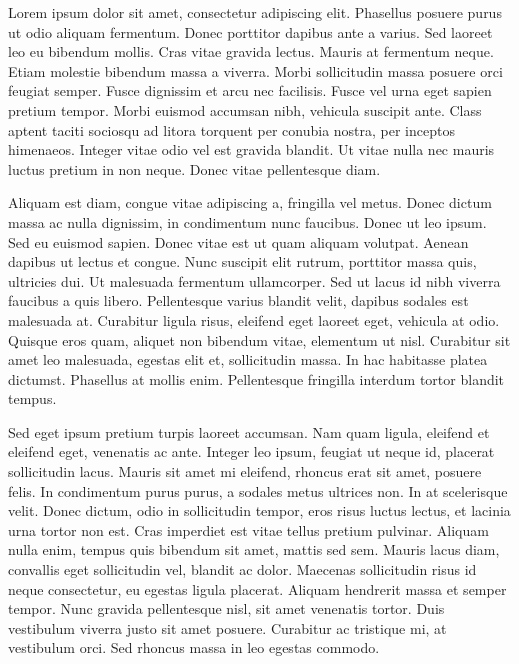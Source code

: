 

Lorem ipsum dolor sit amet, consectetur adipiscing elit. Phasellus posuere purus ut odio aliquam fermentum. Donec porttitor dapibus ante a varius. Sed laoreet leo eu bibendum mollis. Cras vitae gravida lectus. Mauris at fermentum neque. Etiam molestie bibendum massa a viverra. Morbi sollicitudin massa posuere orci feugiat semper. Fusce dignissim et arcu nec facilisis. Fusce vel urna eget sapien pretium tempor. Morbi euismod accumsan nibh, vehicula suscipit ante. Class aptent taciti sociosqu ad litora torquent per conubia nostra, per inceptos himenaeos. Integer vitae odio vel est gravida blandit. Ut vitae nulla nec mauris luctus pretium in non neque. Donec vitae pellentesque diam.

Aliquam est diam, congue vitae adipiscing a, fringilla vel metus. Donec dictum massa ac nulla dignissim, in condimentum nunc faucibus. Donec ut leo ipsum. Sed eu euismod sapien. Donec vitae est ut quam aliquam volutpat. Aenean dapibus ut lectus et congue. Nunc suscipit elit rutrum, porttitor massa quis, ultricies dui. Ut malesuada fermentum ullamcorper. Sed ut lacus id nibh viverra faucibus a quis libero. Pellentesque varius blandit velit, dapibus sodales est malesuada at. Curabitur ligula risus, eleifend eget laoreet eget, vehicula at odio. Quisque eros quam, aliquet non bibendum vitae, elementum ut nisl. Curabitur sit amet leo malesuada, egestas elit et, sollicitudin massa. In hac habitasse platea dictumst. Phasellus at mollis enim. Pellentesque fringilla interdum tortor blandit tempus.

Sed eget ipsum pretium turpis laoreet accumsan. Nam quam ligula, eleifend et eleifend eget, venenatis ac ante. Integer leo ipsum, feugiat ut neque id, placerat sollicitudin lacus. Mauris sit amet mi eleifend, rhoncus erat sit amet, posuere felis. In condimentum purus purus, a sodales metus ultrices non. In at scelerisque velit. Donec dictum, odio in sollicitudin tempor, eros risus luctus lectus, et lacinia urna tortor non est. Cras imperdiet est vitae tellus pretium pulvinar. Aliquam nulla enim, tempus quis bibendum sit amet, mattis sed sem. Mauris lacus diam, convallis eget sollicitudin vel, blandit ac dolor. Maecenas sollicitudin risus id neque consectetur, eu egestas ligula placerat. Aliquam hendrerit massa et semper tempor. Nunc gravida pellentesque nisl, sit amet venenatis tortor. Duis vestibulum viverra justo sit amet posuere. Curabitur ac tristique mi, at vestibulum orci. Sed rhoncus massa in leo egestas commodo.

